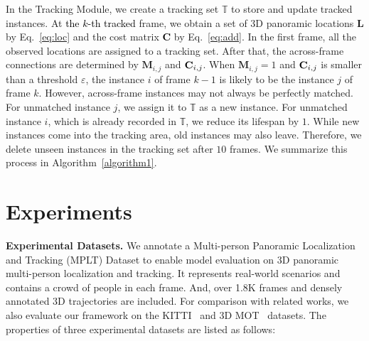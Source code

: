 \documentclass{article}
\newcommand{\Yang}[1]{\textcolor{black}{#1}}
\begin{document}
In the Tracking Module, we create a tracking set $\mathbb{T}$ to store and update tracked instances. At \Yang{the $k$-th tracked} frame, we obtain a set of 3D panoramic locations $\mathbf{L}$ by Eq.~\eqref{eq:loc} and the cost matrix \Yang{$\mathbf{C}$} by Eq.~\eqref{eq:add}. In the first frame, all the observed locations are assigned to a tracking set. After that, the across-frame connections are determined by $\mathbf{M}_{i,j}$ and $\Yang{\mathbf{C}}_{i,j}$. When $\mathbf{M}_{i,j}=1$ and $\Yang{\mathbf{C}}_{i,j}$ is smaller than a threshold $\varepsilon$, the instance $i$ of frame $k-1$ is likely to be the instance $j$ of frame $k$. However, across-frame instances may not always be perfectly matched. For unmatched instance $j$, we assign it to \Yang{$\mathbb{T}$} as a new instance. For unmatched instance $i$, which is already recorded in \Yang{$\mathbb{T}$}, we reduce its lifespan by $1$. While new instances come into the tracking area, old instances may also leave. Therefore, we delete unseen instances in the tracking set after $10$ frames. We summarize this process in Algorithm~\ref{algorithm1}.

\vspace{-7px}
\section{Experiments}
\label{sec:exp}


\noindent \textbf{Experimental Datasets.}
We annotate a Multi-person Panoramic Localization and Tracking (MPLT) Dataset to enable model evaluation on 3D panoramic multi-person localization and tracking. It represents real-world scenarios and contains a crowd of people in each frame. And, over 1.8K frames and densely annotated 3D trajectories are included. For comparison with related works, we also evaluate our framework on the KITTI~\cite{Geiger2012CVPR} and 3D MOT~\cite{andriluka2010monocular} datasets. The properties of three experimental datasets are listed as follows:
\vspace{-17px}
\begin{table}[!h]
\centering
\caption{Properties of experimental datasets.}
\end{table}
\end{document}
